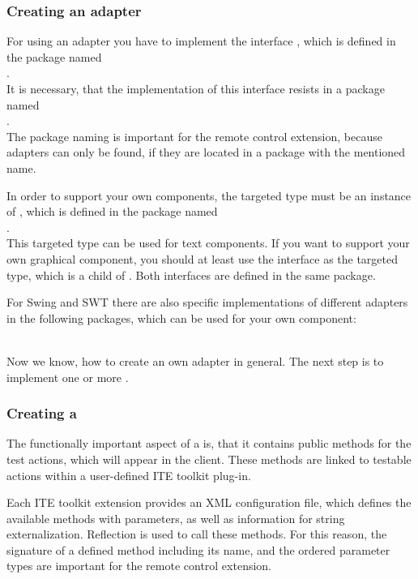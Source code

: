 \subsubsection{Creating an adapter}

For using an adapter you have to implement the interface
, which is defined in the package named\\
.\\
It is necessary, that the implementation of this interface resists in a package
named\\
.\\
The package naming is important for the remote control extension, because
adapters can only be found, if they are located in a package with the mentioned name.

In order to support your own components, the targeted type must be an instance
of , which is defined in the package named\\
.\\
This targeted type can be used for text components. If you want to support your
own graphical component, you should at least use the interface
 as the targeted type, which is a child of
. Both interfaces are defined in the same package.

For Swing and SWT there are also specific implementations of different
adapters in the following packages, which can be used for your own component:\\
\\

Now we know, how to create an own adapter in general. The next step is to
implement one or more \gdtesterclass. 

\subsubsection{Creating a \gdtesterclass}

The functionally important aspect of a \gdtesterclass is, that it
contains public methods for the test actions, which will appear in
the client. These methods are linked to testable actions within a user-defined
ITE toolkit plug-in.

Each ITE toolkit extension provides an XML configuration file, which defines the
available methods with parameters, as well as information for string
externalization. Reflection is used to call these methods. For this reason, the
signature of a defined method including its name, and the ordered parameter
types are important for the remote control extension.

